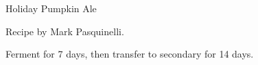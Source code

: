 \stylesection{\stylewinterseasonalbeer}

\begin{recipe}{Holiday Pumpkin Ale}

\begin{aboutblock}
Recipe by Mark Pasquinelli. \sourceaha
\end{aboutblock}


\begin{methodandtiming}
 
\begin{mashsteps}
\end{mashsteps}

\begin{directions}
Ferment for 7 days, then transfer to secondary for 14 days.
\end{directions}

\end{methodandtiming}

\recipebreak

\begin{ingredientsblock}

\begin{malts}
\end{malts}

\begin{hops}
\end{hops}

\begin{twists}
\end{twists}


\end{ingredientsblock}

\end{recipe}
